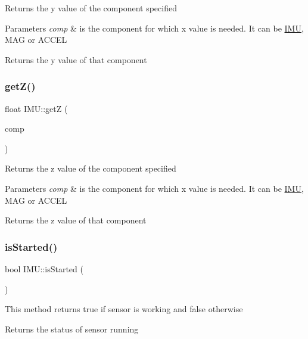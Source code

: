 Returns the y value of the component specified 
\begin{DoxyParams}{Parameters}
{\em comp} & is the component for which x value is needed. It can be \hyperlink{class_i_m_u}{I\+MU}, M\+AG or A\+C\+C\+EL \\
\hline
\end{DoxyParams}
\begin{DoxyReturn}{Returns}
the y value of that component 
\end{DoxyReturn}
\mbox{\label{class_i_m_u_acbea044b92a2e2f2cc554af45692dc62}} 
\subsubsection{\texorpdfstring{get\+Z()}{getZ()}}
{\footnotesize\ttfamily float I\+M\+U\+::getZ (\begin{DoxyParamCaption}\item[{imu\+\_\+comp}]{comp }\end{DoxyParamCaption})}

Returns the z value of the component specified 
\begin{DoxyParams}{Parameters}
{\em comp} & is the component for which x value is needed. It can be \hyperlink{class_i_m_u}{I\+MU}, M\+AG or A\+C\+C\+EL \\
\hline
\end{DoxyParams}
\begin{DoxyReturn}{Returns}
the z value of that component 
\end{DoxyReturn}
\mbox{\label{class_i_m_u_a252166103441e5b7ce10d123c9081505}} 
\subsubsection{\texorpdfstring{is\+Started()}{isStarted()}}
{\footnotesize\ttfamily bool I\+M\+U\+::is\+Started (\begin{DoxyParamCaption}{ }\end{DoxyParamCaption})}

This method returns true if sensor is working and false otherwise \begin{DoxyReturn}{Returns}
the status of sensor running 
\end{DoxyReturn}
\mbox{\label{class_i_m_u_a728c6535b560edafe756982d12f06db0}} 
